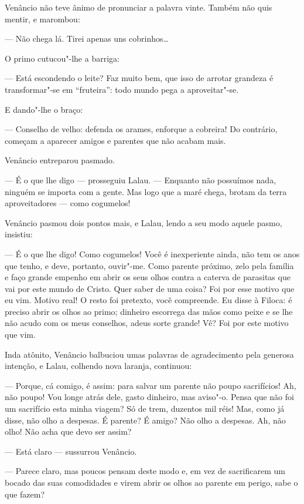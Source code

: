 Venâncio não teve ânimo de pronunciar a palavra vinte. Também não quis
mentir, e marombou:

--- Não chega lá. Tirei apenas uns cobrinhos\ldots{}

O primo cutucou"-lhe a barriga:

--- Está escondendo o leite? Faz muito bem, que isso de arrotar grandeza
é transformar"-se em ``fruteira'': todo mundo pega a aproveitar"-se.

E dando"-lhe o braço:

--- Conselho de velho: defenda os arames, enforque a cobreira! Do
contrário, começam a aparecer amigos e parentes que não acabam mais.

Venâncio entreparou pasmado.

--- É o que lhe digo --- prosseguiu Lalau. --- Enquanto não possuímos
nada, ninguém se importa com a gente. Mas logo que a maré chega, brotam
da terra aproveitadores --- como cogumelos!

Venâncio pasmou dois pontos mais, e Lalau, lendo a seu modo aquele
pasmo, insistiu:

--- É o que lhe digo! Como cogumelos! Você é inexperiente ainda, não tem
os anos que tenho, e deve, portanto, ouvir"-me. Como parente próximo,
zelo pela família e faço grande empenho em abrir os seus olhos contra a
caterva de parasitas que vai por este mundo de Cristo. Quer saber de uma
coisa? Foi por esse motivo que eu vim. Motivo real! O resto foi
pretexto, você compreende. Eu disse à Filoca: é preciso abrir os olhos
ao primo; dinheiro escorrega das mãos como peixe e se lhe não acudo com
os meus conselhos, adeus sorte grande! Vê? Foi por este motivo que vim.

Inda atônito, Venâncio balbuciou umas palavras de agradecimento pela
generosa intenção, e Lalau, colhendo nova laranja, continuou:

--- Porque, cá comigo, é assim: para salvar um parente não poupo
sacrifícios! Ah, não poupo! Vou longe atrás dele, gasto dinheiro, mas
aviso"-o. Pensa que não foi um sacrifício esta minha viagem? Só de trem,
duzentos mil réis! Mas, como já disse, não olho a despesas. É parente? É
amigo? Não olho a despesas. Ah, não olho! Não acha que devo ser assim?

--- Está claro --- sussurrou Venâncio.

--- Parece claro, mas poucos pensam deste modo e, em vez de sacrificarem
um bocado das suas comodidades e virem abrir os olhos ao parente em
perigo, sabe o que fazem?

